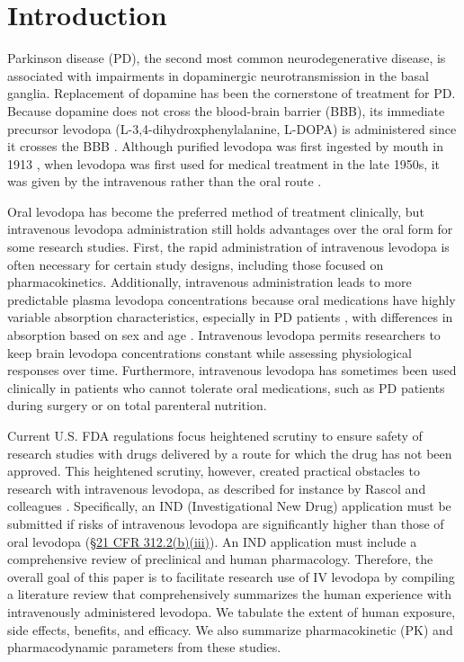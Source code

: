 \section{Introduction}
Parkinson disease (PD), the second most common neurodegenerative disease, is associated with impairments in dopaminergic neurotransmission in the basal ganglia. Replacement of dopamine has been the cornerstone of treatment for PD. Because dopamine does not cross the blood-brain barrier (BBB), its immediate precursor levodopa (L-3,4-dihydroxphenylalanine, L-DOPA) is administered since it crosses the BBB \cite{11763859,13954967,5334614}. Although purified levodopa was first ingested by mouth in 1913 \cite{Roe_1997}, when levodopa was first used for medical treatment in the late 1950s, it was given by the intravenous rather than the oral route \cite{14430381,11763859}.
	
Oral levodopa has become the preferred method of treatment clinically, but intravenous levodopa administration still holds advantages over the oral form for some research studies.  First, the rapid administration of intravenous levodopa is often necessary for certain study designs, including those focused on pharmacokinetics.  Additionally, intravenous administration leads to more predictable plasma levodopa concentrations because oral medications have highly variable absorption characteristics, especially in PD patients \cite{2797454}, with differences in absorption based on sex and age \cite{2775615,12011296}.  Intravenous levodopa permits researchers to keep brain levodopa concentrations constant while assessing physiological responses over time.  Furthermore, intravenous levodopa has sometimes been used clinically in patients who cannot tolerate oral medications, such as PD patients during surgery or on total parenteral nutrition.  

Current U.S. FDA regulations focus heightened scrutiny to ensure safety of research studies with drugs delivered by a route for which the drug has not been approved. This heightened scrutiny, however, created practical obstacles to research with intravenous levodopa, as described for instance by Rascol and colleagues \cite[p. 250]{11176963}.  Specifically, an IND (Investigational New Drug) application must be submitted if risks of intravenous levodopa are significantly higher than those of oral levodopa (\href{http://www.accessdata.fda.gov/scripts/cdrh/cfdocs/cfcfr/CFRSearch.cfm?fr=312.2}{\S 21 CFR 312.2(b)(iii)}). An IND application must include a comprehensive review of preclinical and human pharmacology. Therefore, the overall goal of this paper is to facilitate research use of IV levodopa by compiling a literature review that comprehensively summarizes the human experience with intravenously administered levodopa.  We tabulate the extent of human exposure, side effects, benefits, and efficacy.  We also summarize pharmacokinetic (PK) and pharmacodynamic parameters from these studies. 
